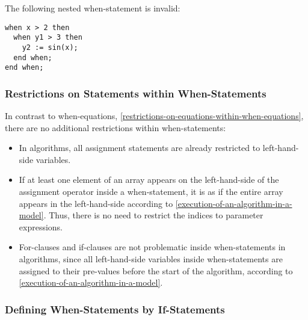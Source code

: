 \begin{example}
The following nested when-statement is invalid:
\begin{lstlisting}[language=modelica]
when x > 2 then
  when y1 > 3 then
    y2 := sin(x);
  end when;
end when;
\end{lstlisting}
\end{example}

\subsubsection{Restrictions on Statements within When-Statements}\label{restrictions-on-statements-within-when-statements}

\begin{nonnormative}
In contrast to when-equations, \cref{restrictions-on-equations-within-when-equations},
there are no additional restrictions within when-statements:
\begin{itemize}
\item
  In algorithms, all assignment statements are already restricted to left-hand-side variables.
\item
  If at least one element of an array appears on the left-hand-side of the assignment operator inside
  a when-statement, it is as if the entire array appears in the left-hand-side
  according to \cref{execution-of-an-algorithm-in-a-model}.
  Thus, there is no need to restrict the indices to parameter expressions.
\item
  For-clauses and if-clauses are not problematic inside when-statements in algorithms, since
  all left-hand-side variables inside when-statements are assigned to their pre-values
  before the start of the algorithm, according to \cref{execution-of-an-algorithm-in-a-model}.
\end{itemize}
\end{nonnormative}
\subsubsection{Defining When-Statements by If-Statements}\label{defining-when-statements-by-if-statements}

